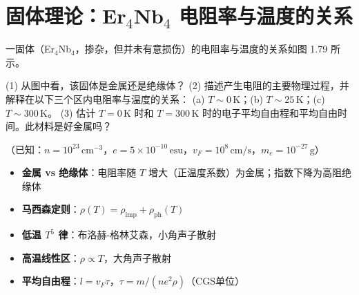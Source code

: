 \section{固体理论：Er$_4$Nb$_4$ 电阻率与温度的关系}
\label{sec:er4nb4-resistivity}

\begin{modelbox}[题目：掺杂金属电阻率的温度依赖与平均自由程]
一固体（Er$_4$Nb$_4$，掺杂，但并未有意损伤）的电阻率与温度的关系如图 1.79 所示。

(1) 从图中看，该固体是金属还是绝缘体？
(2) 描述产生电阻的主要物理过程，并解释在以下三个区内电阻率与温度的关系：
\quad(a) $T\sim0\,$K；\quad(b) $T\sim25\,$K；\quad(c) $T\sim300\,$K。
(3) 估计 $T=0\,$K 时和 $T=300\,$K 时的电子平均自由程和平均自由时间。此材料是好金属吗？

（已知：$n=10^{23}\,\text{cm}^{-3}$，$e=5\times10^{-10}\,\text{esu}$，$v_F=10^8\,\text{cm/s}$，$m_e=10^{-27}\,\text{g}$）
\end{modelbox}

\begin{tipbox}[考点快速分析]
\begin{itemize}
    \item \textbf{金属 vs 绝缘体}：电阻率随 $T$ 增大（正温度系数）为金属；指数下降为高阻绝缘体
    \item \textbf{马西森定则}：$\rho(T)=\rho_{\text{imp}}+\rho_{\text{ph}}(T)$
    \item \textbf{低温 $T^5$ 律}：布洛赫-格林艾森，小角声子散射
    \item \textbf{高温线性区}：$\rho\propto T$，大角声子散射
    \item \textbf{平均自由程}：$l=v_F\tau$，$\tau=m/(ne^2\rho)$（CGS单位）
\end{itemize}
\end{tipbox}

